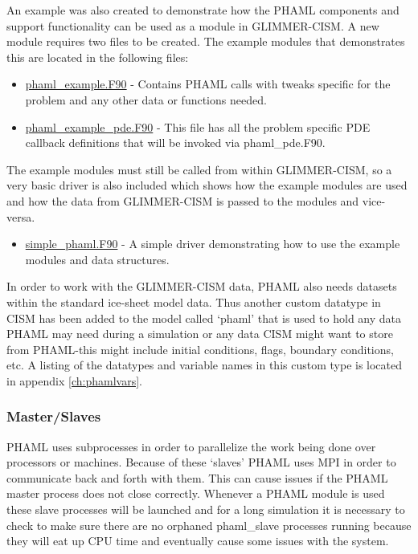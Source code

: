 An example was also created to demonstrate how the PHAML components and support functionality can be used as a module in GLIMMER-CISM.  A new module requires two files to be created.  The example modules that demonstrates this are located in the following files:

\begin{itemize}
\item \href{http://svn.berlios.de/svnroot/repos/glimmer-cism/glimmer-cism2/libphaml/phaml\_example.F90}{phaml\_example.F90} - Contains PHAML calls with tweaks specific for the problem and any other data or functions needed.
\item \href{http://svn.berlios.de/svnroot/repos/glimmer-cism/glimmer-cism2/libphaml/phaml\_example\_pde.F90}{phaml\_example\_pde.F90} - This file has all the problem specific PDE callback definitions that will be invoked via phaml\_pde.F90.
\end{itemize}

The example modules must still be called from within GLIMMER-CISM, so a very basic driver is also included which shows how the example modules are used and how the data from GLIMMER-CISM is passed to the modules and vice-versa.

\begin{itemize}
\item \href{http://svn.berlios.de/svnroot/repos/glimmer-cism/glimmer-cism2/libphaml/simple\_phaml.F90}{simple\_phaml.F90} - A simple driver demonstrating how to use the example modules and data structures.
\end{itemize}

In order to work with the GLIMMER-CISM data, PHAML also needs datasets within the standard ice-sheet model data.  Thus another custom datatype in CISM has been added to the model called `phaml' that is used to hold any data PHAML may need during a simulation or any data CISM might want to store from PHAML-this might include initial conditions, flags, boundary conditions, etc.  A listing of the datatypes and variable names in this custom type is located in appendix \ref{ch:phamlvars}.

\subsubsection{Master/Slaves}

PHAML uses subprocesses in order to parallelize the work being done over processors or machines.  Because of these `slaves' PHAML uses MPI in order to communicate back and forth with them.  This can cause issues if the PHAML master process does not close correctly.  Whenever a PHAML module is used these slave processes will be launched and for a long simulation it is necessary to check to make sure there are no orphaned phaml\_slave processes running because they will eat up CPU time and eventually cause some issues with the system.



